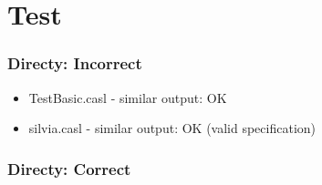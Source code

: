 \documentclass[11pt,a4paper]{article}
\begin{document}
\part*{Test}

\section{Directy: Incorrect}
\begin{itemize}
   \item TestBasic.casl - similar output: OK
   \item silvia.casl    - similar output: OK (valid specification)
\end{itemize}

\section{Directy: Correct}
\end{document}
